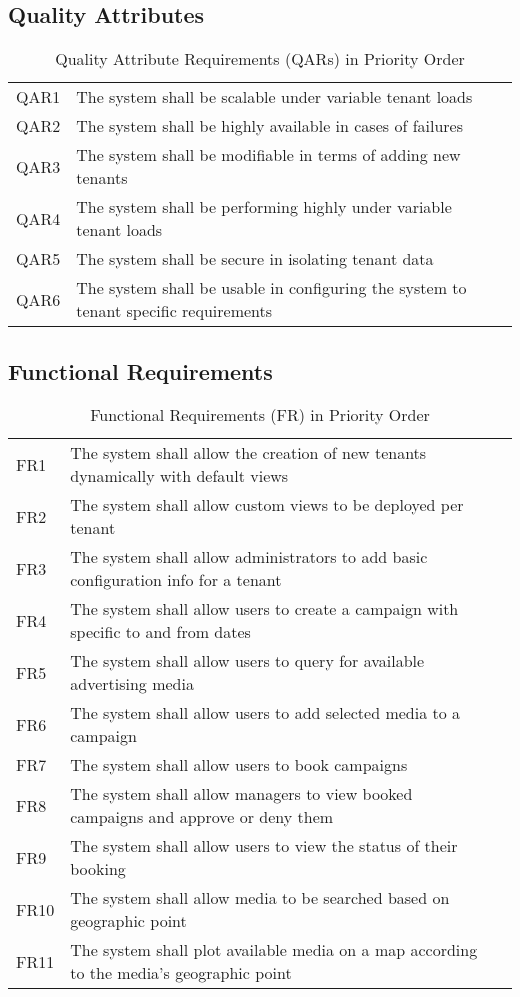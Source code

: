 \subsection{Quality Attributes}
\begin{table}[!h]
\centering
\begin{tabularx}{\linewidth}{|l|X|l}
\cline{1-2}
QAR1 & The system shall be scalable under variable tenant loads &   \\
QAR2 & The system shall be highly available in cases of failures &    \\
QAR3 & The system shall be modifiable in terms of adding new tenants &    \\
QAR4 & The system shall be performing highly under variable tenant loads &    \\
QAR5 & The system shall be secure in isolating tenant data &    \\
QAR6 & The system shall be usable in configuring the system to tenant specific requirements &    \\
\cline{1-2}
\end{tabularx}
\caption{Quality Attribute Requirements (QARs) in Priority Order}
\label{tab:quality_attributes}
\end{table}
\newpage

\subsection{Functional Requirements}
\begin{table}[!h]
\centering
\begin{tabularx}{\linewidth}{|l|X|l}
\cline{1-2}
FR1 & The system shall allow the creation of new tenants dynamically with default views &   \\
FR2 & The system shall allow custom views to be deployed per tenant &    \\
FR3 & The system shall allow administrators to add basic configuration info for a tenant &    \\
FR4 & The system shall allow users to create a campaign with specific to and from dates &    \\
FR5 & The system shall allow users to query for available advertising media &    \\
FR6 & The system shall allow users to add selected media to a campaign &    \\
FR7 & The system shall allow users to book campaigns &   \\
FR8 & The system shall allow managers to view booked campaigns and approve or deny them &  \\
FR9 & The system shall allow users to view the status of their booking &   \\
FR10 & The system shall allow media to be searched based on geographic point &   \\
FR11 & The system shall plot available media on a map according to the media's geographic point &   \\
\cline{1-2}
\end{tabularx}
\caption{Functional Requirements (FR) in Priority Order}
\label{tab:functional_requirements}
\end{table}
\newpage

